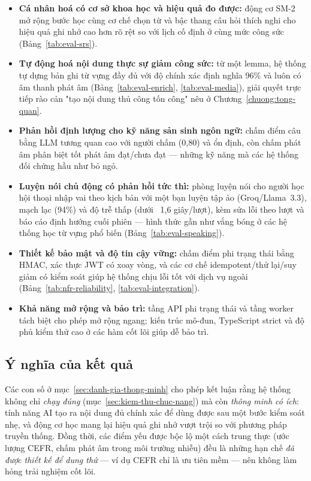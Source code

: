 \begin{itemize}
  \item \textbf{Cá nhân hoá có cơ sở khoa học và hiệu quả đo được:} động cơ
        SM-2 mở rộng bước học cùng cơ chế chọn từ và bậc thang câu hỏi thích
        nghi cho hiệu quả ghi nhớ cao hơn rõ rệt so với lịch cố định ở cùng
        mức công sức (Bảng~\ref{tab:eval-srs}).
  \item \textbf{Tự động hoá nội dung thực sự giảm công sức:} từ một lemma, hệ
        thống tự dựng bản ghi từ vựng đầy đủ với độ chính xác định nghĩa 96\%
        và luôn có âm thanh phát âm (Bảng~\ref{tab:eval-enrich},
        \ref{tab:eval-media}), giải quyết trực tiếp rào cản "tạo nội dung thủ
        công tốn công" nêu ở Chương~\ref{chuong:tong-quan}.
  \item \textbf{Phản hồi định lượng cho kỹ năng sản sinh ngôn ngữ:} chấm điểm
        câu bằng LLM tương quan cao với người chấm (0,80) và ổn định, còn chấm
        phát âm phân biệt tốt phát âm đạt/chưa đạt --- những kỹ năng mà các hệ
        thống đối chứng hầu như bỏ ngỏ.
  \item \textbf{Luyện nói chủ động có phản hồi tức thì:} phòng luyện nói cho
        người học hội thoại nhập vai theo kịch bản với một bạn luyện tập ảo
        (Groq/Llama~3.3), mạch lạc (94\%) và độ trễ thấp (dưới ~1,6 giây/lượt),
        kèm sửa lỗi theo lượt và báo cáo định hướng cuối phiên ---
        hình thức gần như vắng bóng ở các hệ thống học từ vựng phổ biến
        (Bảng~\ref{tab:eval-speaking}).
  \item \textbf{Thiết kế bảo mật và độ tin cậy vững:} chấm điểm phi trạng thái
        bằng HMAC, xác thực JWT có xoay vòng, và các cơ chế idempotent/thử
        lại/suy giảm có kiểm soát giúp hệ thống chịu lỗi tốt với dịch vụ ngoài
        (Bảng~\ref{tab:nfr-reliability}, \ref{tab:eval-integration}).
  \item \textbf{Khả năng mở rộng và bảo trì:} tầng API phi trạng thái và tầng
        worker tách biệt cho phép mở rộng ngang; kiến trúc mô-đun, TypeScript
        strict và độ phủ kiểm thử cao ở các hàm cốt lõi giúp dễ bảo trì.
\end{itemize}

\subsection{Ý nghĩa của kết quả}
\label{subsec:y-nghia}

Các con số ở mục~\ref{sec:danh-gia-thong-minh} cho phép kết luận rằng hệ thống
không chỉ \textit{chạy đúng} (mục~\ref{sec:kiem-thu-chuc-nang}) mà còn
\textit{thông minh có ích}: tính năng AI tạo ra nội dung đủ chính xác để dùng
được sau một bước kiểm soát nhẹ, và động cơ học mang lại hiệu quả ghi nhớ vượt
trội so với phương pháp truyền thống. Đồng thời, các điểm yếu được bộc lộ một
cách trung thực (ước lượng CEFR, chấm phát âm trong môi trường nhiễu) đều là
những hạn chế \textit{đã được thiết kế để dung thứ} --- ví dụ CEFR chỉ là ưu
tiên mềm --- nên không làm hỏng trải nghiệm cốt lõi.

